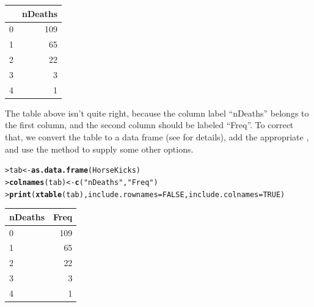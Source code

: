 \documentclass[10pt,krantz2]{krantz}\usepackage[]{graphicx}\usepackage[]{color}
\makeatletter
\newcommand{\hlnum}[1]{\textcolor[rgb]{0.686,0.059,0.569}{#1}}%
\newcommand{\hlstr}[1]{\textcolor[rgb]{0.192,0.494,0.8}{#1}}%
\newcommand{\hlstd}[1]{\textcolor[rgb]{0.345,0.345,0.345}{#1}}%
\newcommand{\hlkwb}[1]{\textcolor[rgb]{0.69,0.353,0.396}{#1}}%
\newcommand{\hlkwc}[1]{\textcolor[rgb]{0.333,0.667,0.333}{#1}}%
\newcommand{\hlkwd}[1]{\textcolor[rgb]{0.737,0.353,0.396}{\textbf{#1}}}%
\newenvironment{kframe}{%
 \def\at@end@of@kframe{}%
 \ifinner\ifhmode%
  \def\at@end@of@kframe{\end{minipage}}%
  \begin{minipage}{\columnwidth}%
 \fi\fi%
 \def\FrameCommand##1{\hskip\@totalleftmargin \hskip-\fboxsep
 \colorbox{shadecolor}{##1}\hskip-\fboxsep
     \hskip-\linewidth \hskip-\@totalleftmargin \hskip\columnwidth}%
 \MakeFramed {\advance\hsize-\width
   \@totalleftmargin\z@ \linewidth\hsize
   \@setminipage}}%
 {\par\unskip\endMakeFramed%
 \at@end@of@kframe}
\makeatother
\begin{document}
\begin{table}[ht]
\centering
\begin{tabular}{rr}
  \hline
 & nDeaths \\ 
  \hline
0 & 109 \\ 
  1 &  65 \\ 
  2 &  22 \\ 
  3 &   3 \\ 
  4 &   1 \\ 
   \hline
\end{tabular}
\end{table}


The table above isn't quite right, because the column label ``nDeaths''
belongs to the first column, and the second column should be labeled ``Freq''.
To correct that, we convert the  table to a data frame
(see  for details), add the appropriate ,
and use the  method to supply some other options.
\begin{kframe}
\begin{alltt}
\hlstd{> }\hlstd{tab} \hlkwb{<-} \hlkwd{as.data.frame}\hlstd{(HorseKicks)}
\hlstd{> }\hlkwd{colnames}\hlstd{(tab)} \hlkwb{<-} \hlkwd{c}\hlstd{(}\hlstr{"nDeaths"}\hlstd{,} \hlstr{"Freq"}\hlstd{)}
\hlstd{> }\hlkwd{print}\hlstd{(}\hlkwd{xtable}\hlstd{(tab),} \hlkwc{include.rownames} \hlstd{=} \hlnum{FALSE}\hlstd{,} \hlkwc{include.colnames} \hlstd{=} \hlnum{TRUE}\hlstd{)}
\end{alltt}
\end{kframe}%
\begin{table}[ht]
\centering
\begin{tabular}{lr}
  \hline
nDeaths & Freq \\ 
  \hline
0 & 109 \\ 
  1 &  65 \\ 
  2 &  22 \\ 
  3 &   3 \\ 
  4 &   1 \\ 
   \hline
\end{tabular}
\end{table}


\end{document}

